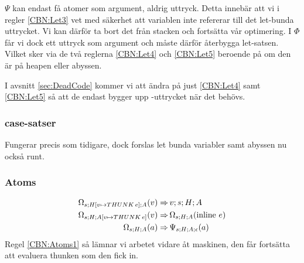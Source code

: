 \documentclass[../Optimise]{subfiles}
\begin{document}
$\Psi$ kan endast få atomer som argument, aldrig uttryck. Detta innebär att vi i regler \eqref{CBN:Let3} vet med säkerhet att variablen inte refererar till det let-bunda uttrycket. Vi kan därför ta bort det från stacken och fortsätta vår optimering. I $\Phi$ får vi dock ett uttryck som argument och måste därför återbygga let-satsen. 
Vilket sker via de två reglerna \eqref{CBN:Let4} och \eqref{CBN:Let5} beroende på om
den är på heapen eller abyssen.

I avsnitt \ref{sec:DeadCode} kommer vi att ändra på just \eqref{CBN:Let4} 
samt \eqref{CBN:Let5} så att de endast bygger upp -uttrycket när det behövs.





\subsubsection{case-satser}
Fungerar precis som tidigare, dock forslas let bunda variabler samt abyssen nu också runt.

\subsubsection{Atoms}
\begin{align}
\label{CBN:Atoms1}\Omega_{s;H[v\mapsto THUNK\,e];A}(v) \Rightarrow &\, v;s;H;A\\
\label{CBN:Atoms2}\Omega_{s;H;A[v\mapsto THUNK\,e]}(v)  \Rightarrow &\, \Omega_{s;H;A}(\text{inline }e)\\
\label{CBN:Atoms3}\Omega_{s;H;A}(a) \Rightarrow &\, \Psi_{s;H;A;\epsilon}(a)
\end{align}
Regel \eqref{CBN:Atoms1} så lämnar vi arbetet vidare åt maskinen, den får fortsätta att
evaluera thunken som den fick in.
\end{document}
